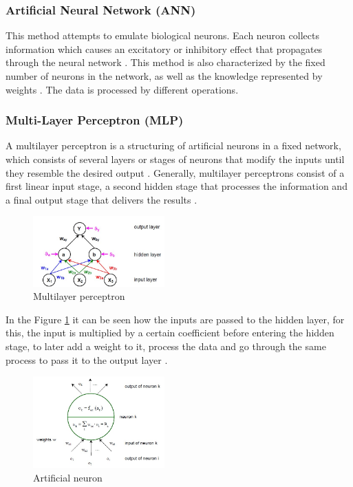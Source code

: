 \documentclass{article}
\begin{document}
\begin{doublespacing}
\subsubsection{Artificial Neural Network (ANN)} 
\par This method attempts to emulate biological neurons. Each neuron collects information which causes an excitatory or inhibitory effect that propagates through the neural network \cite{kaestner:SCANN}. This method is also characterized by the fixed number of neurons in the network, as well as the knowledge represented by weights \cite{kaestner:SCANN}. The data is processed by different operations.

\subsubsection{Multi-Layer Perceptron (MLP)} 

\par A multilayer perceptron is a structuring of artificial neurons in a fixed network, which consists of several layers or stages of neurons that modify the inputs until they resemble the desired output \cite{kaestner:SCANN}. Generally, multilayer perceptrons consist of a first linear input stage, a second hidden stage that processes the information and a final output stage that delivers the results \cite{kaestner:SCANN}.

\begin{figure}[H] 
    \centering
    \includegraphics[width=0.45\textwidth]{Images/ArtificialNeuron.JPG} 
    \caption{Multilayer perceptron \cite{kaestner:SCANN}} 
    \label{fig:ArtificialNeuron} 
\end{figure}

\par In the Figure \ref{fig:ArtificialNeuron} it can be seen how the inputs are passed to the hidden layer, for this, the input is multiplied by a certain coefficient before entering the hidden stage, to later add a weight to it, process the data and go through the same process to pass it to the output layer \cite{kaestner:SCANN}.

\begin{figure}[H] 
    \centering
    \includegraphics[width=0.45\textwidth]{Images/ArtificialNeuronProcess.JPG} 
    \caption{Artificial neuron \cite{kaestner:SCANN}} 
    \label{fig:ArtificialNeuronProcess} 
\end{figure}


\end{doublespacing}
\end{document}

